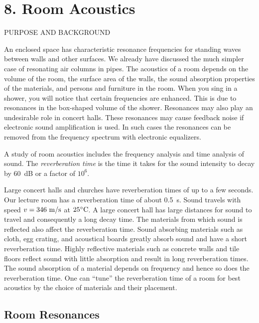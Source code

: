 \documentclass[11pt]{NSF}
\begin{document}
     
\section{8. Room Acoustics}

PURPOSE AND BACKGROUND

An enclosed space has characteristic resonance frequencies for
standing waves between walls and other surfaces. We already have
discussed the much simpler case of resonating air columns in pipes.
The acoustics of a room depends on the volume of the room, the surface
area of the walls, the sound absorption properties of the materials,
and persons and furniture in the room. When you sing in a shower, you
will notice that certain frequencies are enhanced. This is due to
resonances in the box-shaped volume of the shower. Resonances may also
play an undesirable role in concert halls. These resonances may cause
feedback noise if electronic sound amplification is used. In such
cases the resonances can be removed from the frequency spectrum with
electronic equalizers.

A study of room acoustics includes the frequency analysis and time
analysis of sound. The {\em reverberation time} is the time it takes 
for the sound intensity to decay by 60~dB or a factor of $10^6$.

Large concert halls and churches have reverberation times of up to a
few seconds. Our lecture room has a reverberation time of about 0.5~s. 
Sound travels with speed
$v = 346~{\rm m/s}$ at $25{}^\circ{\rm C}$. 
A large
concert hall has large distances for sound to travel and consequently
a long decay time. The materials from which sound is reflected also
affect the reverberation time. Sound absorbing materials such as
cloth, egg crating, and acoustical boards greatly absorb sound and have a
short reverberation time. Highly reflective materials such as concrete
walls and tile floors reflect sound with little absorption and result
in long reverberation times. The sound absorption of a material
depends on frequency and hence so does the reverberation time. One can
``tune” the reverberation time of a room for best acoustics by the
choice of materials and their placement.

\subsection{Room Resonances}
\end{document}
